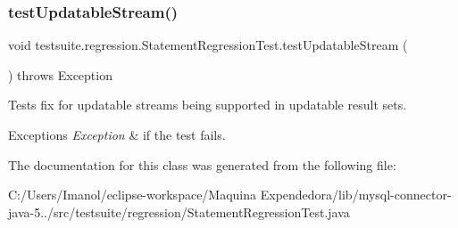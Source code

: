 \subsubsection{\texorpdfstring{test\+Updatable\+Stream()}{testUpdatableStream()}}
{\footnotesize\ttfamily void testsuite.\+regression.\+Statement\+Regression\+Test.\+test\+Updatable\+Stream (\begin{DoxyParamCaption}{ }\end{DoxyParamCaption}) throws Exception}

Tests fix for updatable streams being supported in updatable result sets.


\begin{DoxyExceptions}{Exceptions}
{\em Exception} & if the test fails. \\
\hline
\end{DoxyExceptions}


The documentation for this class was generated from the following file\+:\begin{DoxyCompactItemize}
\item 
C\+:/\+Users/\+Imanol/eclipse-\/workspace/\+Maquina Expendedora/lib/mysql-\/connector-\/java-\/5../src/testsuite/regression/Statement\+Regression\+Test.\+java\end{DoxyCompactItemize}
